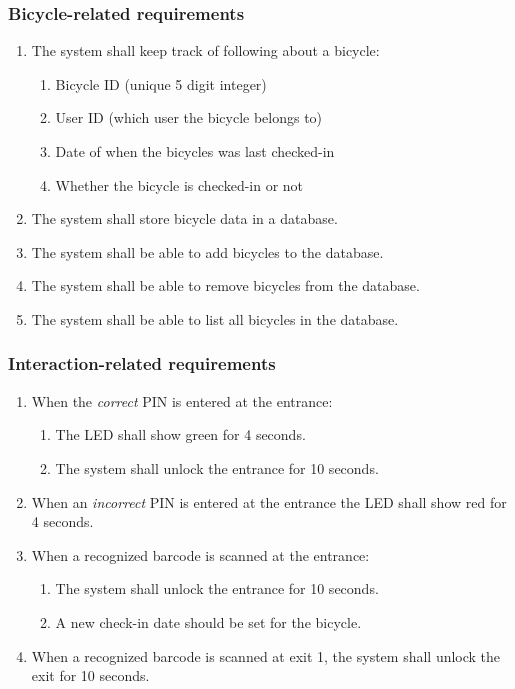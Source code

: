\documentclass[12pt,titlepage,bibliography=totoc]{article}
\begin{document}
\subsubsection{Bicycle-related requirements}
\begin{enumerate}
	\item The system shall keep track of following about a bicycle:
	\begin{enumerate}
		\item Bicycle ID (unique 5 digit integer)
		\item User ID (which user the bicycle belongs to)
		\item Date of when the bicycles was last checked-in
		\item Whether the bicycle is checked-in or not
	\end{enumerate}
	\item The system shall store bicycle data in a database.
	\item The system shall be able to add bicycles to the database.
	\item The system shall be able to remove bicycles from the database.
	\item The system shall be able to list all bicycles in the database.
\end{enumerate}
\subsubsection{Interaction-related requirements}
\begin{enumerate}
	\item When the \emph{correct} PIN is entered at the entrance:
		\begin{enumerate}
			\item The LED shall show green for 4 seconds.
			\item The system shall unlock the entrance for 10 seconds.
		\end{enumerate}
	\item When an \emph{incorrect} PIN is entered at the entrance the LED shall show red for 4 seconds.
	\item When a recognized barcode is scanned at the entrance:
		\begin{enumerate}
			\item The system shall unlock the entrance for 10 seconds.
			\item A new check-in date should be set for the bicycle.
		\end{enumerate}
	\item When a recognized barcode is scanned at exit 1, the system shall unlock the exit for 10 seconds.
\end{enumerate}
\end{document}
